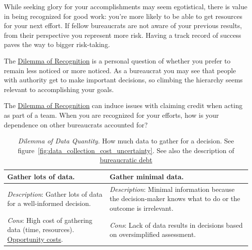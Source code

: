 While seeking glory for your accomplishments may seem egotistical, there is value in being recognized for good work: you're more likely to be able to get resources for your next effort. If fellow bureaucrats are not aware of your previous results, from their perspective you represent more risk. Having a track record of success paves the way to bigger risk-taking.

The \hyperref[table:dilemma-personal-recognition-obscurity]{Dilemma of Recognition} is a personal question of whether you prefer to remain less noticed or more noticed. As a bureaucrat you may see that people with authority get to make important decisions, so climbing the hierarchy seems relevant to accomplishing your goals. 

The \hyperref[table:dilemma-personal-recognition-obscurity]{Dilemma of Recognition} can induce issues with claiming credit when acting as part of a team. When you are recognized for your efforts, how is your dependence on other bureaucrats accounted for?



\begin{center}
\begin{table}[H] %
\begin{tabular}{ | m{\dilemmatablewidth}| m{\dilemmatablewidth} | } 
  \hline
  \textbf{Gather lots of data.} &
  \textbf{Gather minimal data.} \\
  \hline
  \textit{Description}: Gather lots of data for a well-informed decision. &
  \textit{Description}: Minimal information because the decision-maker knows what to do or the outcome is irrelevant.  \\  
  \hline
  \textit{Cons}: High cost of gathering data (time, resources). \href{https://en.wikipedia.org/wiki/Opportunity_cost}{Opportunity costs}.
  \index{Wikipedia!\href{https://en.wikipedia.org/wiki/Opportunity_cost}{Opportunity cost}}
  & 
  \textit{Cons}: Lack of data results in decisions based on oversimplified assessment. \\
  \hline
\end{tabular}
\caption{
\textit{Dilemma of Data Quantity.}
How much data to gather for a decision. See figure~\ref{fig:data_collection_cost_uncertainty}. See also the description of 
\hyperref[sec:bureaucratic-debt]{bureaucratic debt}\iftoggle{haspagenumbers}{ on page~\pageref{sec:bureaucratic-debt}.}{.}
}
\label{table:dilemma-personal-gather-data-lots-vs-little}
\end{table}
\end{center}


